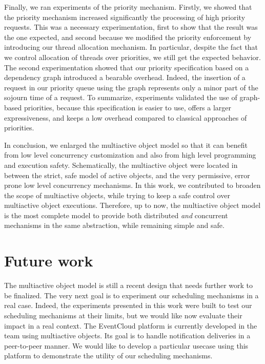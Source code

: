 \documentclass[11pt]{report}
\begin{document}
Finally, we ran experiments of the priority mechanism. Firstly, we showed that the priority mechanism increased significantly the processing of high priority requests. This was a necessary experimentation, first to show that the result was the one expected, and second because we modified the priority enforcement by introducing our thread allocation mechanism. In particular, despite the fact that we control allocation of threads over priorities, we still get the expected behavior. The second experimentation showed that our priority specification based on a dependency graph introduced a bearable overhead. Indeed, the insertion of a request in our priority queue using the graph represents only a minor part of the sojourn time of a request. To summarize, experiments validated the use of graph-based priorities, because this specification is easier to use, offers a larger expressiveness, and keeps a low overhead compared to classical approaches of priorities. 


In conclusion, we enlarged the multiactive object model so that it can benefit from low level concurrency customization and also from high level programming and execution safety. Schematically, the multiactive object were located in between the strict, safe model of active objects, and the very permissive, error prone low level concurrency mechanisms. In this work, we contributed to broaden the scope of multiactive objects, while trying to keep a safe control over multiactive object executions. Therefore, up to now, the multiactive object model is the most complete model to provide both distributed \emph{and} concurrent mechanisms in the same abstraction, while remaining simple and safe.



\section{Future work}
The multiactive object model is still a recent design that needs further work to be finalized. The very next goal is to experiment our scheduling mechanisms in a real case. Indeed, the experiments presented in this work were built to test our scheduling mechanisms at their limits, but we would like now evaluate their impact in a real context. The EventCloud platform \cite{ref:eventcloud} is currently developed in the team using multiactive objects. Its goal is to handle notification deliveries in a peer-to-peer manner. We would like to develop a particular usecase using this platform to demonstrate the utility of our scheduling mechanisms. 
\end{document}
